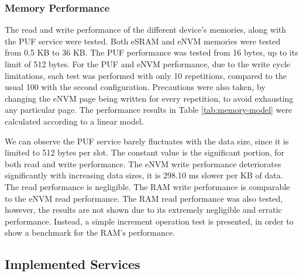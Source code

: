 \subsubsection*{Memory Performance}\label{chap:evaluation:services:memory}

The read and write performance of the different device's memories, along with the PUF service were tested. Both eSRAM and eNVM memories were tested from 0.5 KB to 36 KB. The PUF performance was tested from 16 bytes, up to its limit of 512 bytes. For the PUF and eNVM performance, due to the write cycle limitations, each test was performed with only 10 repetitions, compared to the usual 100 with the second configuration. Precautions were also taken, by changing the eNVM page being written for every repetition, to avoid exhausting any particular page.
The performance results in Table \ref{tab:memory-model} were calculated according to a linear model.



We can observe the PUF service barely fluctuates with the data size, since it is limited to 512 bytes per slot. The constant value is the significant portion, for both read and write performance.
The eNVM write performance deteriorates significantly with increasing data sizes, it is 298.10 ms slower per KB of data. The read performance is negligible.
The RAM write performance is comparable to the eNVM read performance. The RAM read performance was also tested, however, the results are not shown due to its extremely negligible and erratic performance. Instead, a simple increment operation test is presented, in order to show a benchmark for the RAM's performance.

\subsection{Implemented Services}\label{chap:evaluation:services}

